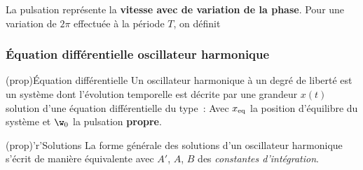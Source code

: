\documentclass[../../main/main.tex]{subfiles}
\begin{document}
\begin{tcbraster}[raster columns=2, raster equal height=rows]
\begin{tcb}[label=exem:graph]
\begin{center}
{			}
		\end{center}
		La pulsation représente la \textbf{vitesse avec de variation de la phase}.
		Pour une variation de $2\pi$ effectuée à la période $T$, on définit
		\psw{
			\[
				\boxed{\w = 2 \frac{\pi}{T} = 2\pi f}
				\Lra
				\boxed{T = \frac{2\pi}{\w}}
			\]
		}
		\vspace{-15pt}
	\end{tcb}
\end{tcbraster}

\subsubsection{Équation différentielle oscillateur harmonique}

\begin{tcbraster}[raster columns=2, raster equal height=rows]
	\begin{tcb}[label=prop:eqdiffoh](prop){Équation différentielle}
		Un oscillateur harmonique à un degré de liberté est un système dont
		l'évolution temporelle est décrite par une grandeur $x(t)$ solution
		d'une équation différentielle du type~:
		\psw{
		\[
			\boxed{ \dv[2]{x}{t} + \w_0{}^2x = \w_0{}^2x_{\rm eq}}
		\]
		}
		Avec $x_{\rm eq}$ la position d'équilibre du système et $\w_0$ la
		pulsation \textbf{propre}.
	\end{tcb}
	\begin{tcb}[label=prop:soluoh](prop)'r'{Solutions}
		La forme générale des solutions d'un oscillateur harmonique s'écrit de
		manière équivalente
		avec $A'$, $A$, $B$ des \textit{constantes d'intégration}.
	\end{tcb}
\end{tcbraster}
\end{document}
